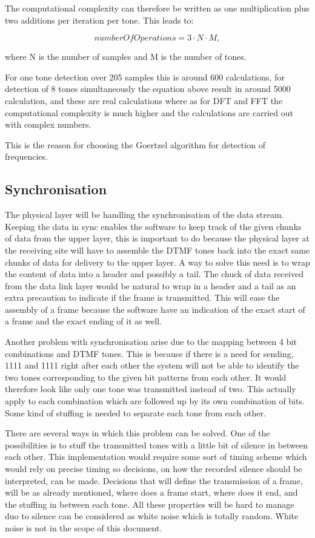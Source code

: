 	The computational complexity can therefore be written as one multiplication plus two additions per iteration per tone.
	This leads to:
	\begin{center}\begin{equation}numberOfOperations = 3\cdot N\cdot M,\end{equation}\end{center}
	where N is the number of samples and M is the number of tones.
	
	For one tone detection over 205 samples this is around 600 calculations, for detection of 8 tones simultaneously the equation
	above result in around 5000 calculation, and these are real calculations where as for DFT and FFT the computational complexity 
	is much higher and the calculations are carried out with complex numbers.
	
	This is the reason for choosing the Goertzel algorithm for detection of frequencies.
	
	\subsection{Synchronisation}
	The physical layer will be handling the synchronisation of the data stream. Keeping the data in sync enables the software to
	keep track of the given chunks of data from the upper layer, this is important to do because the physical layer at the receiving
	site will have to assemble the DTMF tones back into the exact same chunks of data for delivery to the upper layer.
	A way to solve this need is to wrap the content of data into a header and possibly a tail. The chuck of data received from the 
	data link layer would be natural to wrap in a header and a tail as an extra precaution to indicate if the frame is transmitted.
	This will ease the assembly of a frame because the software have an indication of the exact start of a frame and the exact ending
	of it as well.
	
	Another problem with synchronisation arise due to the mapping between 4 bit combinations and DTMF tones. This is because if there is a
	need for sending, 1111 and 1111 right after each other the system will not be able to identify the two tones corresponding to the
	given bit patterns from each other. It would therefore look like only one tone was transmitted instead of two. This actually apply
	to each combination which are followed up by its own combination of bits. Some kind of stuffing is needed to separate each tone
	from each other.
	
	There are several ways in which this problem can be solved. One of the possibilities is to stuff the transmitted tones with a little
	bit of silence in between each other. This implementation would require some sort of timing scheme which would rely on precise timing
	so decisions, on how the recorded silence should be interpreted, can be made. Decisions that will define the transmission of a frame, will be as 
	already mentioned, where does a frame start, where does it end, and the stuffing in between each tone. All these properties will be
	hard to manage duo to silence can be considered as white noise which is totally random. White noise is not in the scope of this 
	document.
	
